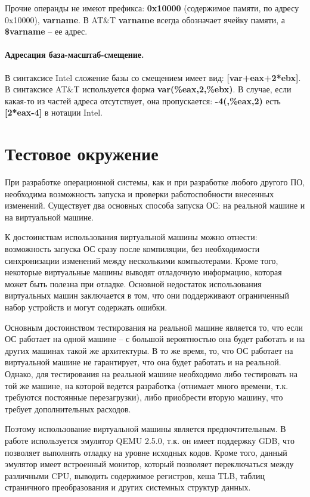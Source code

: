 Прочие операнды не имеют префикса: \textbf{0x10000} (содержимое памяти, по адресу 0x10000),
\textbf{varname}. В AT\&T \textbf{varname} всегда обозначает ячейку памяти, а \textbf{\$varname} --
ее адрес.

\paragraph{Адресация база-масштаб-смещение.} В синтаксисе Intel сложение базы со смещением
имеет вид: \textbf{[var+eax+2*ebx]}. В синтаксисе AT\&T используется форма \textbf{var(\%eax,2,\%ebx)}. В случае, если какая-то
из частей адреса отсутствует, она пропускается: \textbf{-4(,\%eax,2)} есть \textbf{[2*eax-4]} в нотации Intel.

\section{Тестовое окружение}
При разработке операционной системы, как и при разработке любого другого ПО,
необходима возможность запуска и проверки работоспобности внесенных изменений.
Существует два основных способа запуска ОС: на реальной машине
и на виртуальной машине.

К достоинствам использования виртуальной машины можно отнести: возможность
запуска ОС сразу после компиляции, без необходимости синхронизации изменений
между несколькими компьютерами. Кроме того, некоторые виртуальные машины выводят
отладочную информацию, которая может быть полезна при отладке. Основной недостаток
использования виртуальных машин заключается в том, что они поддерживают ограниченный
набор устройств и могут содержать ошибки.

Основным достоинством тестирования на реальной машине является то, что если
ОС работает на одной машине -- с большой вероятностью она будет работать и
на других машинах такой же архитектуры. В то же время, то, что ОС работает
на виртуальной машине не гарантирует, что она будет работать и на реальной.
Однако, для тестирования на реальной машине необходимо либо тестировать на
той же машине, на которой ведется разработка (отнимает много времени, т.к.
требуются постоянные перезагрузки), либо приобрести вторую машину, что требует
дополнительных расходов.

Поэтому использование виртуальной машины является предпочтительным. В работе используется
эмулятор QEMU 2.5.0, т.к. он имеет поддержку GDB, что позволяет
выполнять отладку на уровне исходных кодов. Кроме того, данный эмулятор имеет встроенный
монитор, который позволяет переключаться между различными CPU, выводить содержимое
регистров, кеша TLB, таблиц страничного преобразования и других системных структур данных.


